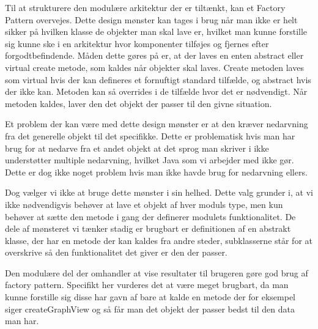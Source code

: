 Til at strukturere den modulære arkitektur der er tiltænkt, kan et Factory Pattern overvejes.
Dette design mønster kan tages i brug når man ikke er helt sikker på hvilken klasse de objekter man skal lave er, hvilket man kunne forstille sig kunne ske i en arkitektur hvor komponenter tilføjes og fjernes efter forgodtbefindende.
Måden dette gøres på er, at der laves en enten abstract eller virtual create metode, som kaldes når objekter skal laves.
Create metoden laves som virtual hvis der kan defineres et fornuftigt standard tilfælde, og abstract hvis der ikke kan.
Metoden kan så overrides i de tilfælde hvor det er nødvendigt.
Når metoden kaldes, laver den det objekt der passer til den givne situation.

Et problem der kan være med dette design mønster er at den kræver nedarvning fra det generelle objekt til det specifikke.
Dette er problematisk hvis man har brug for at nedarve fra et andet objekt at det sprog man skriver i ikke understøtter multiple nedarvning, hvilket Java som vi arbejder med ikke gør.
Dette er dog ikke noget problem hvis man ikke havde brug for nedarvning ellers.

Dog vælger vi ikke at bruge dette mønster i sin helhed.
Dette valg grunder i, at vi ikke nødvendigvis behøver at lave et objekt af hver moduls type, men kun behøver at sætte den metode i gang der definerer modulets funktionalitet.
De dele af mønsteret vi tænker stadig er brugbart er definitionen af en abstrakt klasse, der har en metode der kan kaldes fra andre steder, subklasserne står for at overskrive så den funktionalitet det giver er den der passer.

Den modulære del der omhandler at vise resultater til brugeren gøre god brug af factory pattern.
Specifikt her vurderes det at være meget brugbart, da man kunne forstille sig disse har gavn af bare at kalde en metode der for eksempel siger createGraphView og så får man det objekt der passer bedst til den data man har.
